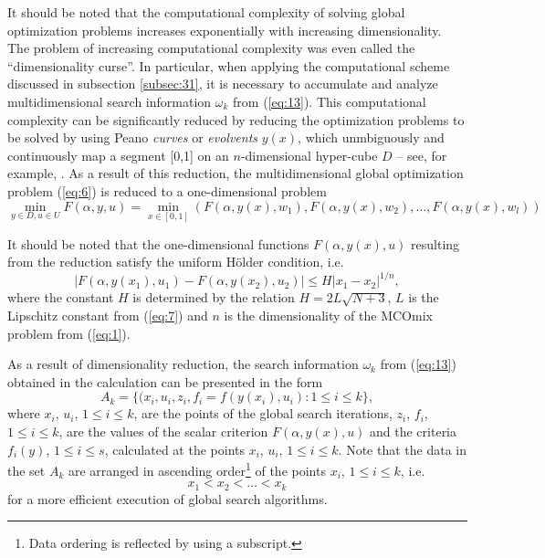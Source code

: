 \documentclass{svproc}
\begin{document}
It should be noted that the computational complexity of solving global optimization problems increases exponentially with increasing dimensionality. The problem of increasing computational complexity was even called the ``dimensionality curse''. In particular, when applying the computational scheme discussed in subsection \ref{subsec:31}, it is necessary to accumulate and analyze multidimensional search information $\omega_k$ from (\ref{eq:13}). This computational complexity can be significantly reduced by reducing the optimization problems to be solved by using Peano \textit{curves} or \textit{evolvents} $y(x)$, which unmbiguously and continuously map a segment [0,1] on an $n$-dimensional hyper-cube $D$ -- see, for example, \cite{c24,c25}. As a result of this reduction, the multidimensional global optimization problem (\ref{eq:6}) is reduced to a one-dimensional problem
\begin{equation}\label{eq:15}
 \min_{y\in D, u \in U}F(\alpha,y,u) = \min_{x \in [0,1]}(F(\alpha,y(x),w_1 ),F(\alpha,y(x),w_2 ),\dots,F(\alpha,y(x),w_l ))
\end{equation}

It should be noted that the one-dimensional functions $F(\alpha,y(x),u)$ resulting from the reduction satisfy the uniform H{\" o}lder condition, i.e.
\begin{equation}\label{eq:16}
|F(\alpha, y(x_1),u_1)-F(\alpha, y(x_2),u_2)| \leq H|x_1-x_2 |^{1/n},
\end{equation}
where the constant $H$ is determined by the relation $H=2L\sqrt{N+3}$, $L$ is the Lipschitz constant from (\ref{eq:7}) and $n$ is the dimensionality of the MCOmix problem from (\ref{eq:1}). 

As a result of dimensionality reduction, the search information $\omega_k$ from (\ref{eq:13}) obtained in the calculation can be presented in the form 
\begin{equation}\label{eq:17}
A_k=\{(x_i, u_i, z_i, f_i = f(y(x_i), u_i): 1 \leq i \leq k \},
\end{equation}
where $x_i$, $u_i$, $1 \leq i \leq k$,  are the points of the global search iterations, $z_i$, $f_i$, $1 \leq i \leq k$,  are the values of the scalar criterion $F(\alpha,y(x),u)$ and the criteria $f_i (y)$, $1 \leq i \leq s$, calculated at the points $x_i$, $u_i$, $1 \leq i \leq k$. Note that the data in the set $A_k$ are arranged in ascending order\footnote{Data ordering is reflected by using a subscript.} of the points $x_i$, $1 \leq i \leq k$, i.e.
\begin{equation}\label{eq:18}
 x_1< x_2< \dots < x_k
\end{equation}
for a more efficient execution of global search algorithms.
\end{document}

